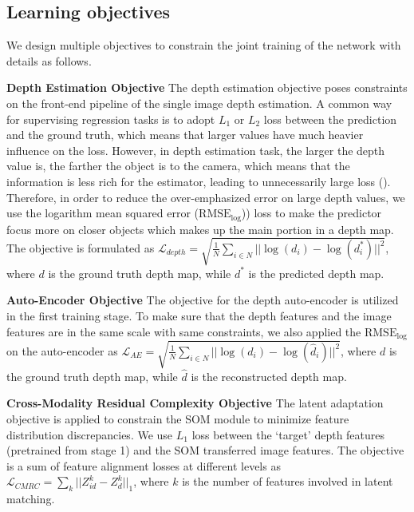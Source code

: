 \documentclass[letterpaper]{article} \usepackage{aaai20}  \usepackage{times}  \usepackage{helvet} \usepackage{courier}  \usepackage{graphicx} \frenchspacing  \setlength{\pdfpagewidth}{8.5in}  \setlength{\pdfpageheight}{11in}  \usepackage{epsfig}
\begin{document}
    \subsection{Learning objectives}
    We design multiple objectives to constrain the joint training of the network with details as follows.
    
    \textbf{Depth Estimation Objective} \hspace{0.3cm} The depth estimation objective poses constraints on the front-end pipeline of the single image depth estimation. A common way for supervising regression tasks is to adopt $L_1$ or $L_2$ loss between the prediction and the ground truth, which means that larger values have much heavier influence on the loss. However, in depth estimation task, the larger the depth value is, the farther the object is to the camera, which means that the information is less rich for the estimator, leading to unnecessarily large loss (\cite{Fu2018Deep}). Therefore, in order to reduce the over-emphasized error on large depth values, we use the logarithm mean squared error ($\text{RMSE}_{\log}$)) loss to make the predictor focus more on closer objects which makes up the main portion in a depth map. The objective is formulated as $\mathcal{L}_{depth} = \sqrt{\frac{1}{N}\sum_{i\in N}||\log(d_i) - \log(d_i^*)||^2}$, where $d$ is the ground truth depth map, while $d^*$ is the predicted depth map.
    
    \textbf{Auto-Encoder Objective} \hspace{0.3cm} The objective for the depth auto-encoder is utilized in the first training stage. To make sure that the depth features and the image features are in the same scale with same constraints, we also applied the $\text{RMSE}_{\log}$ on the auto-encoder as $\mathcal{L}_{AE} = \sqrt{\frac{1}{N}\sum_{i\in N}||\log(d_i) - \log(\hat d_i)||^2}$, where $d$ is the ground truth depth map, while $\hat d$ is the reconstructed depth map. 
    
    \textbf{Cross-Modality Residual Complexity Objective} \hspace{0.3cm} The latent adaptation objective is applied to constrain the SOM module to minimize feature distribution discrepancies. We use $L_1$ loss between the `target' depth features (pretrained from stage 1) and the SOM transferred image features. The objective is a sum of feature alignment losses at different levels as $\mathcal{L}_{CMRC} = \sum_k||Z^k_{id} - Z^k_d||_1$, where $k$ is the number of features involved in latent matching. 
    
\end{document}
